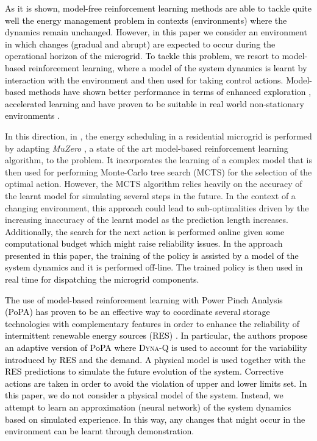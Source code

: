 \documentclass{article}
\begin{document}
	\textcolor{black}{As it is shown, model-free reinforcement learning methods are able to tackle quite well the energy management problem in contexts (environments) where the dynamics remain unchanged. However, in this paper we consider an environment in which changes (gradual and abrupt) are expected to occur during the operational horizon of the microgrid. To tackle this problem, we resort to model-based reinforcement learning, where a model of the system dynamics is learnt by interaction with the environment and then used for taking control actions. Model-based methods have shown better performance in terms of enhanced exploration \cite{lopes2012exploration}, accelerated learning \cite{kaiser2019model} and have proven to be suitable in real world non-stationary environments \cite{lopes2012exploration, polydoros2017survey}.
	}
	
	In this direction, in \cite{shuai2020line}, the energy scheduling in a residential microgrid is performed by adapting \textit{MuZero} \cite{schrittwieser2019mastering}, a state of the art model-based reinforcement learning algorithm, to the problem. It incorporates the learning of a complex model that is then used for performing Monte-Carlo tree search (MCTS) for the selection of the optimal action. However, the MCTS algorithm relies heavily on the accuracy of the learnt model for simulating several steps in the future. In the context of a changing environment, this approach could lead to sub-optimalities driven by the increasing inaccuracy of the learnt model as the prediction length increases. \textcolor{black}{Additionally, the search for the next action is performed online given some computational budget which might raise reliability issues. In the approach presented in this paper, the training of the policy is assisted by a model of the system dynamics and it is performed off-line. The trained policy is then used in real time for dispatching the microgrid components.}
	
	\textcolor{black}{
	 The use of model-based reinforcement learning with Power Pinch Analysis (PoPA) has proven to be an effective way to coordinate several storage technologies with complementary features in order to enhance the reliability of intermittent renewable energy sources (RES) \cite{NYONGBASSEY2020116622}. In particular, the authors propose an adaptive version of PoPA where \textsc{Dyna-Q} \cite{SUTTON1990216} is used to account for the variability introduced by RES and the demand. A physical model is used together with the RES predictions to simulate the future evolution of the system. Corrective actions are taken in order to avoid the violation of upper and lower limits set. In this paper, we do not consider a physical model of the system. Instead, we attempt to learn an approximation (neural network) of the system dynamics based on simulated experience. In this way, any changes that might occur in the environment can be learnt through demonstration.}
	
\end{document}
